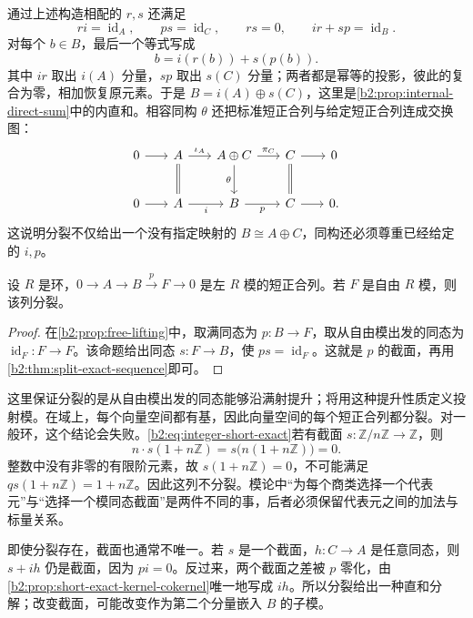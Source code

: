 通过上述构造相配的 \(r,s\) 还满足
\[
	ri=\operatorname{id}_A,\qquad ps=\operatorname{id}_C, \qquad rs=0,\qquad ir+sp=\operatorname{id}_B.
\]
对每个 \(b\in B\)，最后一个等式写成
\[
	b=i(r(b))+s(p(b)).
\]
其中 \(ir\) 取出 \(i(A)\) 分量，\(sp\) 取出 \(s(C)\) 分量；两者都是幂等的投影，彼此的复合为零，相加恢复原元素。于是 \(B=i(A)\oplus s(C)\)，这里是\cref{b2:prop:internal-direct-sum}中的内直和。相容同构 \(\theta\) 还把标准短正合列与给定短正合列连成交换图：
\[
	\begin{tikzcd}[column sep=1.8em,row sep=2.3em]
		0\arrow[r]&A\arrow[r,"\iota_A"]\arrow[d,equal] &A\oplus C\arrow[r,"\pi_C"]\arrow[d,"\theta"'] &C\arrow[r]\arrow[d,equal]&0\\
		0\arrow[r]&A\arrow[r,"i"']&B\arrow[r,"p"']&C\arrow[r]&0.
	\end{tikzcd}
\]
这说明分裂不仅给出一个没有指定映射的 \(B\cong A\oplus C\)，同构还必须尊重已经给定的 \(i,p\)。

\begin{corollary}[商模自由时的分裂]\label{b2:cor:free-quotient-splits}
	设 \(R\) 是环，\(0\to A\to B\xrightarrow{p}F\to0\) 是左 \(R\) 模的短正合列。若 \(F\) 是自由 \(R\) 模，则该列分裂。
\end{corollary}

\begin{proof}
	在\cref{b2:prop:free-lifting}中，取满同态为 \(p:B\to F\)，取从自由模出发的同态为 \(\operatorname{id}_F:F\to F\)。该命题给出同态 \(s:F\to B\)，使 \(ps=\operatorname{id}_F\)。这就是 \(p\) 的截面，再用\cref{b2:thm:split-exact-sequence}即可。
\end{proof}

这里保证分裂的是从自由模出发的同态能够沿满射提升；将用这种提升性质定义投射模。在域上，每个向量空间都有基，因此向量空间的每个短正合列都分裂。对一般环，这个结论会失败。\eqref{b2:eq:integer-short-exact}若有截面 \(s:\mathbb Z/n\mathbb Z\to\mathbb Z\)，则
\[
	n\cdot s(1+n\mathbb Z)=s\bigl(n(1+n\mathbb Z)\bigr)=0.
\]
整数中没有非零的有限阶元素，故 \(s(1+n\mathbb Z)=0\)，不可能满足 \(qs(1+n\mathbb Z)=1+n\mathbb Z\)。因此这列不分裂。模论中“为每个商类选择一个代表元”与“选择一个模同态截面”是两件不同的事，后者必须保留代表元之间的加法与标量关系。

\ProseParagraphBreak
即使分裂存在，截面也通常不唯一。若 \(s\) 是一个截面，\(h:C\to A\) 是任意同态，则 \(s+ih\) 仍是截面，因为 \(pi=0\)。反过来，两个截面之差被 \(p\) 零化，由\cref{b2:prop:short-exact-kernel-cokernel}唯一地写成 \(ih\)。所以分裂给出一种直和分解；改变截面，可能改变作为第二个分量嵌入 \(B\) 的子模。

